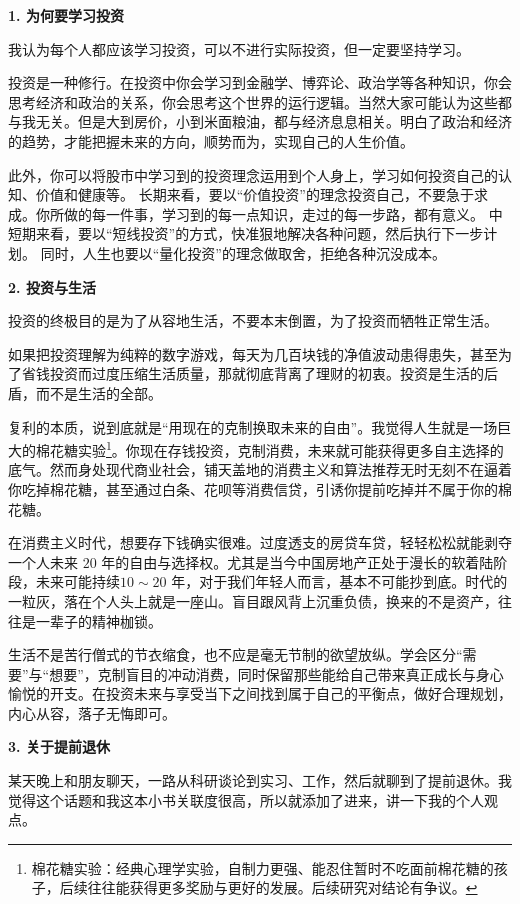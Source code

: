 \documentclass[12pt,openany]{book}
\newcommand{\subhead}[1]{%
    \par\vspace{0.5\baselineskip}%
    \noindent\textbf{#1}\par%
    \vspace{0.5\baselineskip}%
}
\begin{document}
\subhead{1. 为何要学习投资}

我认为每个人都应该学习投资，可以不进行实际投资，但一定要坚持学习。

投资是一种修行。在投资中你会学习到金融学、博弈论、政治学等各种知识，你会思考经济和政治的关系，你会思考这个世界的运行逻辑。当然大家可能认为这些都与我无关。但是大到房价，小到米面粮油，都与经济息息相关。明白了政治和经济的趋势，才能把握未来的方向，顺势而为，实现自己的人生价值。

此外，你可以将股市中学习到的投资理念运用到个人身上，学习如何投资自己的认知、价值和健康等。
长期来看，要以“价值投资”的理念投资自己，不要急于求成。你所做的每一件事，学习到的每一点知识，走过的每一步路，都有意义。
中短期来看，要以“短线投资”的方式，快准狠地解决各种问题，然后执行下一步计划。
同时，人生也要以“量化投资”的理念做取舍，拒绝各种沉没成本。

\subhead{2. 投资与生活}

投资的终极目的是为了从容地生活，不要本末倒置，为了投资而牺牲正常生活。

如果把投资理解为纯粹的数字游戏，每天为几百块钱的净值波动患得患失，甚至为了省钱投资而过度压缩生活质量，那就彻底背离了理财的初衷。投资是生活的后盾，而不是生活的全部。

复利的本质，说到底就是“用现在的克制换取未来的自由”。我觉得人生就是一场巨大的棉花糖实验\footnote{棉花糖实验：经典心理学实验，自制力更强、能忍住暂时不吃面前棉花糖的孩子，后续往往能获得更多奖励与更好的发展。后续研究对结论有争议。}。你现在存钱投资，克制消费，未来就可能获得更多自主选择的底气。然而身处现代商业社会，铺天盖地的消费主义和算法推荐无时无刻不在逼着你吃掉棉花糖，甚至通过白条、花呗等消费信贷，引诱你提前吃掉并不属于你的棉花糖。

在消费主义时代，想要存下钱确实很难。过度透支的房贷车贷，轻轻松松就能剥夺一个人未来 $20$ 年的自由与选择权。尤其是当今中国房地产正处于漫长的软着陆阶段，未来可能持续$10\sim 20$ 年，对于我们年轻人而言，基本不可能抄到底。时代的一粒灰，落在个人头上就是一座山。盲目跟风背上沉重负债，换来的不是资产，往往是一辈子的精神枷锁。

生活不是苦行僧式的节衣缩食，也不应是毫无节制的欲望放纵。学会区分“需要”与“想要”，克制盲目的冲动消费，同时保留那些能给自己带来真正成长与身心愉悦的开支。在投资未来与享受当下之间找到属于自己的平衡点，做好合理规划，内心从容，落子无悔即可。

\newpage

\subhead{3. 关于提前退休}

某天晚上和朋友聊天，一路从科研谈论到实习、工作，然后就聊到了提前退休。我觉得这个话题和我这本小书关联度很高，所以就添加了进来，讲一下我的个人观点。
\end{document}
